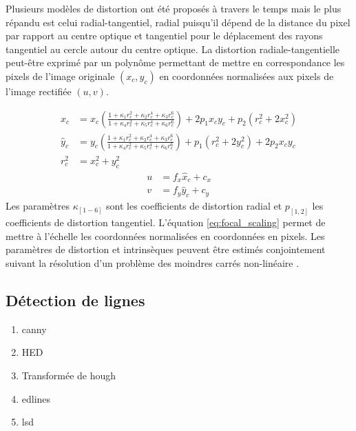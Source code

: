 Plusieurs modèles de distortion ont été proposés à travers le temps mais le plus répandu est celui radial-tangentiel, radial puisqu'il dépend de la distance du pixel par rapport au centre optique et tangentiel pour le déplacement des rayons tangentiel au cercle autour du centre optique. La distortion radiale-tangentielle peut-être exprimé par un polynôme permettant de mettre en correspondance les pixels de l'image originale $(x_c, y_c)$ en coordonnées normalisées aux pixels de l'image rectifiée $(u, v)$.

\begin{equation}
\begin{aligned}
  \hat{x}_c &= x_c\left(\frac{1 + \kappa_1r_c^2 + \kappa_2r_c^4 + \kappa_3r_c^6}{1 + \kappa_4r_c^2 + \kappa_5r_c^4 + \kappa_6r_c^6}\right) + 2p_1 x_c y_c + p_2(r_c^2 + 2 x_c^2) \\
  \hat{y}_c &= y_c\left(\frac{1 + \kappa_1r_c^2 + \kappa_2r_c^4 + \kappa_3r_c^6}{1 + \kappa_4r_c^2 + \kappa_5r_c^4 + \kappa_6r_c^6}\right) + p_1 (r_c^2 + 2 y_c^2) + 2p_2 x_c y_c \\
  r_c^2     &= x_c^2 + y_c^2
  \label{eq:rectification}
\end{aligned}
\end{equation}
\begin{equation}
\begin{aligned}
  u & = f_x \hat{x}_c + c_x\\
  v &= f_y \hat{y}_c + c_y
  \label{eq:focal_scaling}
\end{aligned}
\end{equation}
Les paramètres $\kappa_{[1-6]}$ sont les coefficients de distortion radial et $p_{[1,2]}$ les coefficients de distortion tangentiel. L'équation \ref{eq:focal_scaling} permet de mettre à l'échelle les coordonnées normalisées en coordonnées en pixels. Les paramètres de distortion et intrinsèques peuvent être estimés conjointement suivant la résolution d'un problème des moindres carrés non-linéaire \citep{Zhang2000}.

\subsection{Détection de lignes}

\begin{enumerate}
  \item canny
  \item HED
  \item Transformée de hough
  \item edlines
  \item lsd
\end{enumerate}
